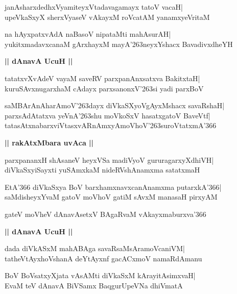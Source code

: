 \documentclass[twoside,12pt,openright]{book}
\def\S{\char'263}
\newcounter{shloka}[chapter]
\def\uvaca#1{\centerline{{\large\textbf{#1}}}}
\begin{document}
\begin{shloka}%
janAsharxdedhxVyamiteyxVtadavagamayx tatoV vacaH|\\
upeVkaSxyX sherxVyaseV vAkayxM roVcatAM yanamxyeVritaM
\end{shloka}

\begin{shloka}%
na hAyxpatxvAdA naBasoV nipataMti mahAsurAH|\\
yukitxmadavxcanaM gArxhayxM mayA\S neyxYshacx BavadivxdheYH
\end{shloka}

\uvaca{|| dAnavA UcuH ||}
\begin{shloka}%
tatatxvXvAdeV vayaM saveRV parxpanAnxsatxva BakitxtaH|\\
kuruSAvxnugarxhaM cAdayx parxsanonxV\S si yadi parxBoV
\end{shloka}

\begin{shloka}%
saMBArAnAharAmoV\S dayx diVkaSXyoVgAyxMshacx savaRshaH|\\
parxsAdAtatxva yeVnA\S shu moVkoSxV hasatxgatoV BaveVtf|\\
tatasAtxnabarxviVtasxvARnAmxyAmoVhoV\S suroVtatxmA\char'366
\end{shloka}

\uvaca{|| rakAtxMbara uvAca ||}
\begin{shloka}%
parxpananxH shAsaneV heyxVSa madiVyoV gururagarxyXdhiVH|\\
diVkaSxyiSayxti yuSAmxkaM nideRVshAnamxma satatxmaH
\end{shloka}

\begin{shloka}%
EtA\char'366 diVkaSxya BoV barxhamxnavxcanAnamxma putarxkA\char'366|\\
saMdisheyxYvaM gatoV moVhoV gatiM sAvxM manasaH pirxyAM
\end{shloka}

\begin{shloka}%
gateV moVheV dAnavAsetxV BAgaRvaM vAkayxmaburxva\char'366
\end{shloka}

\uvaca{|| dAnavA UcuH ||}
\begin{shloka}%
dada diVkASxM mahABAga savaRsaMsAramoVcaniVM|\\
tatheVtAyxhoVshanA deYtAyxnf gacACxmoV namaRdAmanu
\end{shloka}

\begin{shloka}%
BoV BoVsatxyXjata vAsAMti diVkaSxM kArayitAsimxvaH|\\
EvaM teV dAnavA BiVSamx BaqgurUpeVNa dhiVmatA
\end{shloka}
\end{document}
